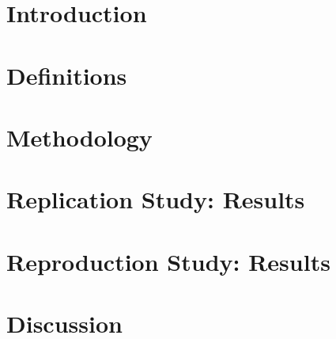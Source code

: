 \minitoc


\section{Introduction}
\label{sec:buildability:intro}


% 

\section{Definitions}
\label{sec:buildability:definitions}


\section{Methodology}
\label{sec:buildability:metodology}


\section{Replication Study: Results}
\label{sec:buildability:results-repli}


\section{Reproduction Study: Results}
\label{sec:buildability:results-repro}
 

\section{Discussion}
\label{sec:buildability:discussion}


% 